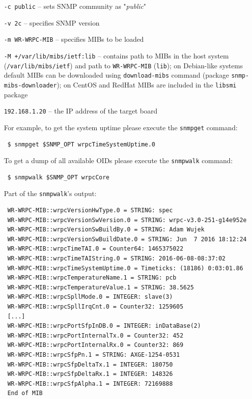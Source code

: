\documentclass[a4paper, 12pt]{article}
\renewcommand{\_}{\underscore\allowbreak}
\begin{document}
\begin{sloppypar} %
\begin{itemize*}
   \item \texttt{-c public} -- sets SNMP community as "\textit{public}"
   \item \texttt{-v 2c} -- specifies SNMP version
   \item \texttt{-m WR-WRPC-MIB} -- specifies MIBs to be loaded
   \item \texttt{-M +/var/lib/mibs/ietf:lib} -- contains path to MIBs in the host
         system (\texttt{/var/lib/mibs/ietf}) and path to \texttt{WR-WRPC-MIB} (\texttt{lib});
         on Debian-like systems default MIBs can be downloaded using
         \texttt{download-mibs} command (package \texttt{snmp-mibs-downloader}); on
         CentOS and RedHat MIBs are included in the \texttt{libsmi} package
   \item \texttt{192.168.1.20} -- the IP address of the target board
\end{itemize*}\end{sloppypar}\noindent
For example, to get the system uptime please execute the \texttt{snmpget} command:
\begin{lstlisting}
 $ snmpget $SNMP_OPT wrpcTimeSystemUptime.0
\end{lstlisting}
To get a dump of all available OIDs please execute the \texttt{snmpwalk}
command:
\begin{lstlisting}
 $ snmpwalk $SNMP_OPT wrpcCore
\end{lstlisting}
Part of the \texttt{snmpwalk}'s output:
\begin{lstlisting}
 WR-WRPC-MIB::wrpcVersionHwType.0 = STRING: spec
 WR-WRPC-MIB::wrpcVersionSwVersion.0 = STRING: wrpc-v3.0-251-g14e952e
 WR-WRPC-MIB::wrpcVersionSwBuildBy.0 = STRING: Adam Wujek
 WR-WRPC-MIB::wrpcVersionSwBuildDate.0 = STRING: Jun  7 2016 18:12:24
 WR-WRPC-MIB::wrpcTimeTAI.0 = Counter64: 1465375022
 WR-WRPC-MIB::wrpcTimeTAIString.0 = STRING: 2016-06-08-08:37:02
 WR-WRPC-MIB::wrpcTimeSystemUptime.0 = Timeticks: (18186) 0:03:01.86
 WR-WRPC-MIB::wrpcTemperatureName.1 = STRING: pcb
 WR-WRPC-MIB::wrpcTemperatureValue.1 = STRING: 38.5625
 WR-WRPC-MIB::wrpcSpllMode.0 = INTEGER: slave(3)
 WR-WRPC-MIB::wrpcSpllIrqCnt.0 = Counter32: 1259605
 [...]
 WR-WRPC-MIB::wrpcPortSfpInDB.0 = INTEGER: inDataBase(2)
 WR-WRPC-MIB::wrpcPortInternalTx.0 = Counter32: 452
 WR-WRPC-MIB::wrpcPortInternalRx.0 = Counter32: 869
 WR-WRPC-MIB::wrpcSfpPn.1 = STRING: AXGE-1254-0531
 WR-WRPC-MIB::wrpcSfpDeltaTx.1 = INTEGER: 180750
 WR-WRPC-MIB::wrpcSfpDeltaRx.1 = INTEGER: 148326
 WR-WRPC-MIB::wrpcSfpAlpha.1 = INTEGER: 72169888
 End of MIB
\end{lstlisting}
\end{document}
